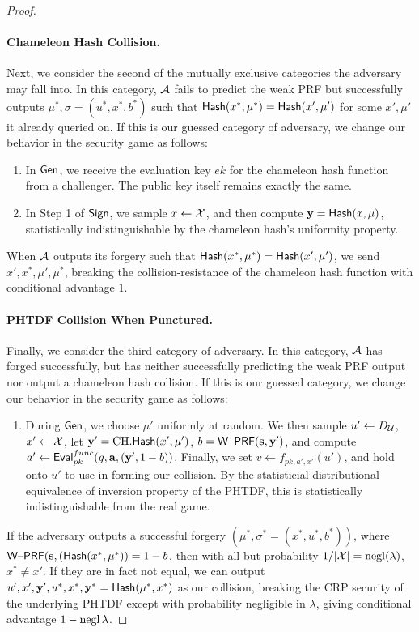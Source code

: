 \begin{proof}
\paragraph{Chameleon Hash Collision.} Next, we consider the second of
the mutually exclusive categories the adversary may fall into. In this
category, $\mathcal{A}$ fails to predict the
weak PRF but successfully outputs $\mu^*,\sigma=(u^*,x^*,b^*)$ such that
$\mathsf{Hash}(x^*,\mu^*)=\mathsf{Hash}(x',\mu')$ for some $x',\mu'$ it already
queried on.  If this is our guessed category of adversary, we change our behavior in the security game as follows:
\begin{enumerate}
\item In $\mathsf{Gen}$, we receive the evaluation key $ek$ for the
  chameleon hash function from a challenger. The public key itself remains
  exactly the same.
\item In Step 1 of $\mathsf{Sign}$, we sample $x \gets
\mathcal{X}$, and then compute $\mathbf{y} = \mathsf{Hash}(x,\mu)$, 
statistically indistinguishable by the chameleon hash's uniformity
property.
\end{enumerate}
When $\mathcal{A}$ outputs its  forgery such that 
$\mathsf{Hash}(x^*,\mu^*)=\mathsf{Hash}(x',\mu')$, we send
$x',x^*,\mu',\mu^*$, breaking the collision-resistance
of the chameleon hash function with conditional advantage $1$. 

\paragraph{PHTDF Collision When Punctured.} Finally, we consider the
third category of adversary. In this category, $\mathcal{A}$ has
forged successfully, but has neither successfully predicting the weak
PRF output nor output  a chameleon hash collision. If this is our
guessed category, we change our behavior in the security game as follows:
\begin{enumerate}
\item During $\mathsf{Gen}$, we choose $\mu'$ uniformly at
  random. We then sample
  $u' \gets D_{\mathcal{U}}$, $x' \gets \mathcal{X}$, let
  $\mathbf{y}'=\text{CH}.\mathsf{Hash}(x',\mu')$, $b=\mathsf{W\text{\textendash}PRF}(\mathbf{s},\mathbf{y}')$, and compute
  $a' \gets \mathsf{Eval}_{pk}^{func}(g,\mathbf{a},(\mathbf{y}',1-b))$. 
Finally, we set
  $v \gets f_{pk,a',x'}(u')$, and hold onto $u'$ to use in forming our
  collision. By the statisticial distributional
  equivalence of inversion property of the PHTDF, this is
  statistically indistinguishable from the real game.
\end{enumerate}
If the adversary outputs a successful forgery
$(\mu^*,\sigma^*=(x^*,u^*,b^*))$, where
$\mathsf{W\text{\textendash}PRF}(\mathbf{s},(\mathsf{Hash}(x^*,\mu^*))=1-b$, then with all but 
probability $1/\lvert\mathcal{X}\rvert=\operatorname{negl}(\lambda)$, $x^* \neq x'$. If they are in fact not equal, we can
output $u',x',\mathbf{y}',u^*,x^*,\mathbf{y}^*=\mathsf{Hash}(\mu^*,x^*)$ as our collision,
breaking the CRP security of the underlying PHTDF except with
probability negligible in $\lambda$, giving conditional advantage
$1-\operatorname{negl}{\lambda}$. 

\end{proof}
